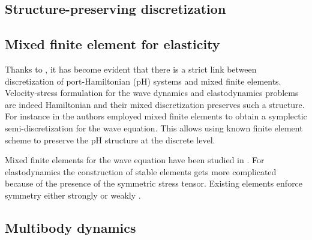 \subsection{Structure-preserving discretization}

\subsection{Mixed finite element for elasticity}

Thanks to \cite{cardoso2018pfem}, it has become evident that there is a strict link between  discretization of port-Hamiltonian (pH) systems and mixed finite elements. Velocity-stress formulation for the wave dynamics and elastodynamics problems are indeed Hamiltonian and their mixed discretization preserves such a structure. For instance in \cite{kirby2015} the authors employed mixed finite elements to obtain a  symplectic semi-discretization for the wave equation. This allows using known finite element scheme to preserve the pH structure at the discrete level.

Mixed finite elements for the wave equation have been studied in \cite{geveci1988,becache2000wave}. For elastodynamics the construction of stable elements gets more complicated because of the presence of the symmetric stress tensor. Existing elements enforce symmetry either strongly \cite{becache2001elas} or weakly \cite{arnold2014elastodynamics}.

\subsection{Multibody dynamics}

